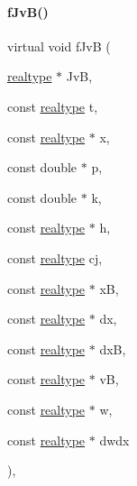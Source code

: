 \paragraph{\texorpdfstring{f\+Jv\+B()}{fJvB()}\hspace{0.1cm}{\footnotesize\ttfamily [2/2]}}
{\footnotesize\ttfamily virtual void f\+JvB (\begin{DoxyParamCaption}\item[{\mbox{\hyperlink{namespaceamici_a1bdce28051d6a53868f7ccbf5f2c14a3}{realtype}} $\ast$}]{JvB,  }\item[{const \mbox{\hyperlink{namespaceamici_a1bdce28051d6a53868f7ccbf5f2c14a3}{realtype}}}]{t,  }\item[{const \mbox{\hyperlink{namespaceamici_a1bdce28051d6a53868f7ccbf5f2c14a3}{realtype}} $\ast$}]{x,  }\item[{const double $\ast$}]{p,  }\item[{const double $\ast$}]{k,  }\item[{const \mbox{\hyperlink{namespaceamici_a1bdce28051d6a53868f7ccbf5f2c14a3}{realtype}} $\ast$}]{h,  }\item[{const \mbox{\hyperlink{namespaceamici_a1bdce28051d6a53868f7ccbf5f2c14a3}{realtype}}}]{cj,  }\item[{const \mbox{\hyperlink{namespaceamici_a1bdce28051d6a53868f7ccbf5f2c14a3}{realtype}} $\ast$}]{xB,  }\item[{const \mbox{\hyperlink{namespaceamici_a1bdce28051d6a53868f7ccbf5f2c14a3}{realtype}} $\ast$}]{dx,  }\item[{const \mbox{\hyperlink{namespaceamici_a1bdce28051d6a53868f7ccbf5f2c14a3}{realtype}} $\ast$}]{dxB,  }\item[{const \mbox{\hyperlink{namespaceamici_a1bdce28051d6a53868f7ccbf5f2c14a3}{realtype}} $\ast$}]{vB,  }\item[{const \mbox{\hyperlink{namespaceamici_a1bdce28051d6a53868f7ccbf5f2c14a3}{realtype}} $\ast$}]{w,  }\item[{const \mbox{\hyperlink{namespaceamici_a1bdce28051d6a53868f7ccbf5f2c14a3}{realtype}} $\ast$}]{dwdx }\end{DoxyParamCaption})\hspace{0.3cm}{\ttfamily [protected]}, {\ttfamily [virtual]}}

